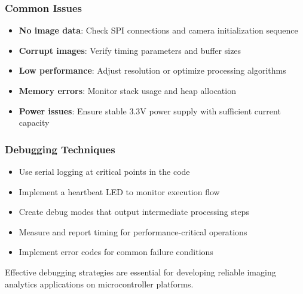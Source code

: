 \subsubsection{Common Issues}
\begin{itemize}
	\item \textbf{No image data}: Check SPI connections and camera initialization sequence
	\item \textbf{Corrupt images}: Verify timing parameters and buffer sizes
	\item \textbf{Low performance}: Adjust resolution or optimize processing algorithms
	\item \textbf{Memory errors}: Monitor stack usage and heap allocation
	\item \textbf{Power issues}: Ensure stable 3.3V power supply with sufficient current capacity
\end{itemize}

\subsubsection{Debugging Techniques}
\begin{itemize}
	\item Use serial logging at critical points in the code
	\item Implement a heartbeat LED to monitor execution flow
	\item Create debug modes that output intermediate processing steps
	\item Measure and report timing for performance-critical operations
	\item Implement error codes for common failure conditions
\end{itemize}

Effective debugging strategies are essential for developing reliable imaging analytics applications on microcontroller platforms.